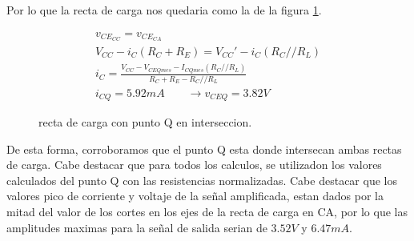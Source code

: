     Por lo que la recta de carga nos quedaria como la de la figura \ref{fig:recta_carga}.
    \begin{figure}[!ht]
      \centering
      \begin{minipage}{0.45\textwidth}
      \end{minipage}
      \begin{minipage}{0.54\textwidth}
        \begin{gather*}
          v_{CE_{CC}} = v_{CE_{CA}}\\[6pt]
          V_{CC} - i_C (R_C + R_E) = V_{CC}' - i_C (R_C//R_L)\\[6pt]
          i_C = \frac{V_{CC} - V_{CEQ mes} - I_{CQ mes} (R_C//R_L)}{R_C + R_E - R_C//R_L}\\[6pt]
          i_{CQ} = 5.92mA \qquad \to v_{CEQ} = 3.82V
        \end{gather*}
      \end{minipage}
      \caption{recta de carga con punto Q en interseccion.}
      \label{fig:recta_carga}
    \end{figure}

    De esta forma, corroboramos que el punto Q esta donde intersecan ambas rectas de carga. Cabe destacar que para todos
    los calculos, se utilizadon los valores calculados del punto Q con las resistencias normalizadas. Cabe destacar que
    los valores pico de corriente y voltaje de la señal amplificada, estan dados por la mitad del valor de los cortes
    en los ejes de la recta de carga en CA, por lo que las amplitudes maximas para la señal de salida serian de $3.52V$
    y $6.47mA$.
\newpage
